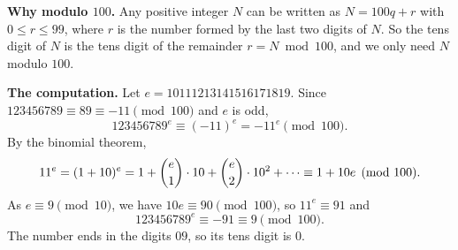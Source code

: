 \textbf{Why modulo $100$.} Any positive integer $N$ can be written as $N=100q+r$ with $0\le r\le99$, where $r$ is the number formed by the last two digits of $N$. So the tens digit of $N$ is the tens digit of the remainder $r=N\bmod100$, and we only need $N$ modulo $100$.

\textbf{The computation.} Let $e=10111213141516171819$. Since $123456789\equiv89\equiv-11\pmod{100}$ and $e$ is odd,
\[123456789^{e}\equiv(-11)^e=-11^e\pmod{100}.\]
By the binomial theorem,
\[11^e=(1+10)^e=1+\dbinom e1\cdot10+\dbinom e2\cdot10^2+\cdots\equiv1+10e\pmod{100}.\]
As $e\equiv9\pmod{10}$, we have $10e\equiv90\pmod{100}$, so $11^e\equiv91$ and
\[123456789^{e}\equiv-91\equiv9\pmod{100}.\]
The number ends in the digits $09$, so its tens digit is $\boxed{0}$.

